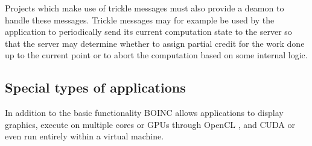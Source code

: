 Projects which make use of trickle messages must also provide a deamon to handle these messages. Trickle messages may for example be used by the application to periodically send its current computation state to the server  so that the server may   determine whether to assign partial credit for the work done up to the current point  or   to abort the computation based on some internal logic.

\subsection{Special types of applications} \label{Btypes}
In addition to the basic functionality BOINC allows applications to display graphics, execute on multiple cores or GPUs through OpenCL \cite{opencl}, and CUDA \cite{cuda} or even run entirely within a virtual machine. 
